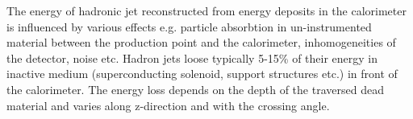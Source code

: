 The energy of hadronic jet reconstructed from energy deposits in the calorimeter is influenced by various effects e.g. particle absorbtion in un-instrumented material between the production point and the calorimeter, inhomogeneities of the detector, noise etc. Hadron jets loose typically 5-15\% of their energy in inactive medium (superconducting solenoid, support structures etc.) in front of the calorimeter. The energy loss depends on the depth of the traversed dead material and varies along z-direction and with the crossing angle.